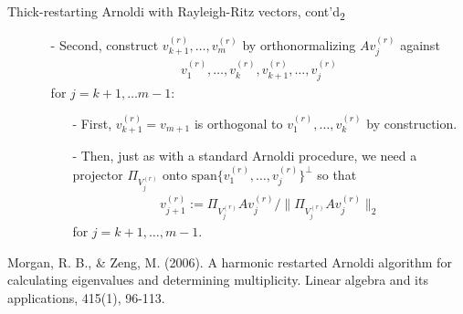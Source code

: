 \documentclass[t,usepdftitle=false]{beamer}
\begin{document}
\begin{frame}{Thick-restarting Arnoldi with Rayleigh-Ritz vectors, cont'd\textsubscript{2}}
\begin{itemize}
\item[]
\begin{itemize}\normalsize
\item[-] Second, construct $v_{k+1}^{(r)},\dots,v_m^{(r)}$ by orthonormalizing $Av_{j}^{(r)}$ against
\begin{align*}
v_1^{(r)},\dots,v_k^{(r)},v_{k+1}^{(r)},\dots,v_{j}^{(r)}
\end{align*}
for $j=k+1,\dots m-1$:
\begin{itemize}\normalsize
\item[-]First, $v_{k+1}^{(r)}=v_{m+1}$ is orthogonal to $v_1^{(r)},\dots,v_k^{(r)}$ by construction.\vspace{.1cm}
\item[-]Then, just as with a standard Arnoldi procedure, we need a projector $\Pi_{V_j^{(r)}}$ onto 
$\text{span}\{v_1^{(r)},\dots,v_j^{(r)}\}^\perp$ so that
\begin{align*}
v_{j+1}^{(r)}:=\Pi_{V_j^{(r)}}Av_j^{(r)}/\|\Pi_{V_j^{(r)}}Av_j^{(r)}\|_2
\end{align*}
for $j=k+1,\dots,m-1$.
\end{itemize}
\end{itemize}
\end{itemize}\smallskip
\tiny{Morgan, R. B., \& Zeng, M. (2006). A harmonic restarted Arnoldi algorithm for calculating eigenvalues and determining
multiplicity. Linear algebra and its applications, 415(1), 96-113.}
\end{frame}
\end{document}
